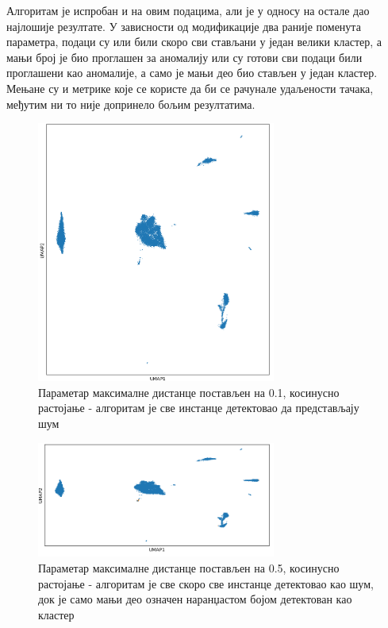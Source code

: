 \documentclass[10pt, a4paper]{article}
\begin{document}
Алгоритам је испробан и на овим подацима, али је у односу на остале дао најлошије резултате. У зависности од модификације два раније поменута параметра, подаци су или били скоро сви стављани у један велики кластер, а мањи број је био проглашен за аномалију или су готови сви подаци били проглашени као аномалије, а само је мањи део био стављен у један кластер. Мењане су и метрике које се користе да би се рачунале удаљености тачака, међутим ни то није допринело бољим резултатима.
\begin{figure}[H]
    \centering
    \captionsetup{justification=centering}
    \includegraphics[width=0.7\textwidth]{DBSCAN_cosine_eps01.png}
    \caption{Параметар максималне дистанце постављен на 0.1, косинусно растојање - алгоритам је све инстанце детектовао да представљају шум}
    \label{fig:gustina1}
\end{figure}
\begin{figure}[H]
    \centering
    \captionsetup{justification=centering}
    \includegraphics[width=0.7\textwidth]{DBSCAN_cosine_05.png}
    \caption{Параметар максималне дистанце постављен на 0.5, косинусно растојање - алгоритам је све скоро све инстанце детектовао као шум, док је само мањи део означен наранџастом бојом детектован као кластер}
    \label{fig:gustina2}
\end{figure}
\end{document}
